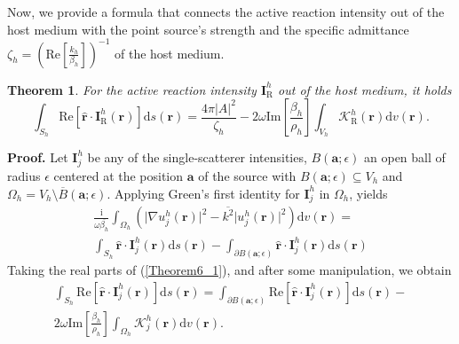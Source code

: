 \documentclass{article}
\newtheorem{theorem}{Theorem}
\begin{document}
Now, we provide a formula that connects the active reaction intensity out of the host medium with the point source's strength and the specific admittance $\zeta_h=\left(\mathrm{Re}\left[{\frac{k_h}{\beta_h}}\right]\right)^{-1}$ of the host medium.
%
\begin{theorem}
    For the active reaction intensity $\mathbf{I}_{\mathrm{R}}^h$ out of the host medium, it holds
%
\begin{equation}
\label{Theorem6_0}
\int_{S_h}\mathrm{Re}\left[\hat{\mathbf{r}}\cdot\mathbf{I}_{\mathrm{R}}^h(\mathbf{r})\right]\mathrm{d}s(\mathbf{r})=\frac{4\pi\lvert A\rvert^2}{\zeta_h}-2\omega\mathrm{Im}\left[\frac{\beta_h}{\rho_h}\right]\int_{V_h}\mathcal{K}_{\mathrm{R}}^h(\mathbf{r})\mathrm{d}v(\mathbf{r}).
\end{equation}
%
\end{theorem}
%
\textbf{Proof.}
    Let $\mathbf{I}_j^h$ be any of the single-scatterer intensities, $B(\mathbf{a};\epsilon)$ an open ball of radius $\epsilon$ centered at the position $\mathbf{a}$ of the source with $B(\mathbf{a};\epsilon)\subseteq V_h$ and $\Omega_h=V_h\setminus \overline{B}(\mathbf{a};\epsilon)$. Applying Green's first identity for $\mathbf{I}_j^h$ in $\Omega_h$, yields
%
\begin{align}
\nonumber
\frac{\mathrm{i}}{\omega\overline{\beta_h}}\int_{\Omega_h}\left(\lvert\nabla u_j^{h}(\mathbf{r})\rvert^2-\overline{k^2}\lvert u_j^{h}(\mathbf{r})\rvert^2\right)\mathrm{d}v(\mathbf{r})=\\\int_{S_h}\hat{\mathbf{r}}\cdot\mathbf{I}_j^h(\mathbf{r})\mathrm{d}s(\mathbf{r})-\int_{\partial B(\mathbf{a};\epsilon)}\hat{\mathbf{r}}\cdot\mathbf{I}_j^h(\mathbf{r})\mathrm{d}s(\mathbf{r})\label{Theorem6_1}
\end{align}
%
Taking the real parts of (\ref{Theorem6_1}), and after some manipulation, we obtain
%
\begin{align}
\nonumber
\int_{S_h}\mathrm{Re}\left[\hat{\mathbf{r}}\cdot\mathbf{I}_j^h(\mathbf{r})\right]\mathrm{d}s(\mathbf{r})=\int_{\partial B(\mathbf{a};\epsilon)}\mathrm{Re}\left[\hat{\mathbf{r}}\cdot\mathbf{I}_j^h(\mathbf{r})\right]\mathrm{d}s(\mathbf{r})-\\2\omega\mathrm{Im}\left[\frac{\beta_h}{\rho_h}\right]\int_{\Omega_h}\mathcal{K}_j^h(\mathbf{r})\mathrm{d}v(\mathbf{r}).\label{Theorem6_3}
\end{align}
%
\end{document}
